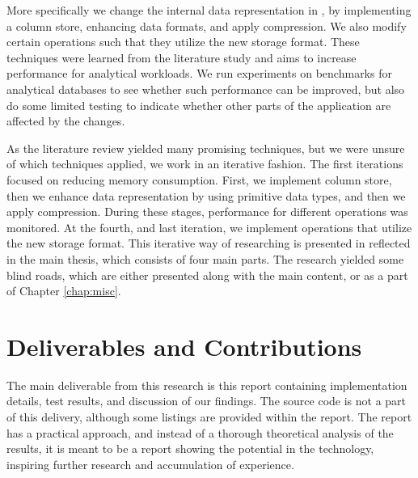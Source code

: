 More specifically we change the internal data representation in \gap, by implementing a column store, enhancing data formats, and apply compression. We also modify certain operations such that they utilize the new storage format. These techniques were learned from the literature study and aims to increase performance for analytical workloads. We run experiments on benchmarks for analytical databases to see whether such performance can be improved, but also do some limited testing to indicate whether other parts of the application are affected by the changes.

As the literature review yielded many promising techniques, but we were unsure of which techniques applied, we work in an iterative fashion. The first iterations focused on reducing memory consumption. First, we implement column store, then we enhance data representation by using primitive data types, and then we apply compression. During these stages, performance for different operations was monitored. At the fourth, and last iteration, we implement operations that utilize the new storage format. This iterative way of researching is presented in reflected in the main thesis, which consists of four main parts. The research yielded some blind roads, which are either presented along with the main content, or as a part of Chapter \ref{chap:misc}. 


% 

\section{Deliverables and Contributions}
\label{sec:Deliverables and Contributions}
The main deliverable from this research is this report containing implementation details, test results, and discussion of our findings. The source code is not a part of this delivery, although some listings are provided within the report. The report has a practical approach, and instead of a thorough theoretical analysis of the results, it is meant to be a report showing the potential in the technology, inspiring further research and accumulation of experience.

